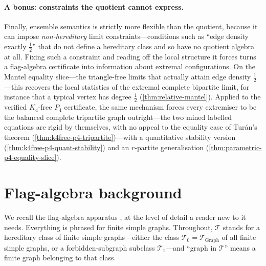 \documentclass[11pt]{article}
\theoremstyle{definition}
\newcommand{\T}{\mathcal{T}}
\begin{document}
\paragraph{A bonus: constraints the quotient cannot express.}
Finally, ensemble semantics is strictly more flexible than the quotient, because it can
impose \emph{non-hereditary} limit constraints---conditions such as ``edge density exactly
$\tfrac12$'' that do not define a hereditary class and so have no quotient algebra at all.
Fixing such a constraint and reading off the local structure it forces turns a
flag-algebra certificate into information about extremal configurations.  On the Mantel
equality slice---the triangle-free limits that actually attain edge density
$\tfrac12$---this recovers the local statistics of the extremal complete bipartite
limit, for instance that a typical vertex has degree $\tfrac12$ (\cref{thm:relative-mantel}).
Applied to the verified $K_4$-free $P_4$ certificate, the same mechanism forces every
extremiser to be the balanced complete tripartite graph outright---the two mined
labelled equations are rigid by themselves, with no appeal to the equality case of
Tur\'an's theorem (\cref{thm:k4free-p4-tripartite})---with a quantitative stability
version (\cref{thm:k4free-p4-quant-stability}) and an
$r$-partite generalisation (\cref{thm:parametric-p4-equality-slice}).

\section{Flag-algebra background}\label{sec:background}

We recall the flag-algebra apparatus \cite{Razborov2007}, at the level of detail a reader
new to it needs.  Everything is phrased for finite simple graphs.  Throughout, $\T$ stands
for a hereditary class of finite simple graphs---either the class
$\T_0=\T_{\mathrm{Graph}}$ of all finite simple graphs, or a forbidden-subgraph subclass
$\T_1$---and ``graph in $\T$'' means a finite graph belonging to that class.
\end{document}
